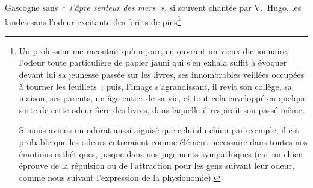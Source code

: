 \documentclass[french,twoside]{book} %
\begin{document}
Gascogne sans \emph{« l’âpre senteur des mers »}, si souvent chantée par V. Hugo, les landes sans l’odeur excitante des forêts de pins\footnote{\noindent Un professeur me racontait qu’un jour, en ouvrant un vieux dictionnaire, l’odeur toute particulière de papier jauni qui s’en exhala suffit à évoquer devant lui sa jeunesse passée sur les livres, ses innombrables veillées occupées à tourner les feuillets ; puis, l’image s’agrandissant, il revit son collège, sa maison, ses parents, un âge entier de sa vie, et tout cela enveloppé en quelque sorte de cette odeur âcre des livres, dans laquelle il respirait son passé même.\par
Si nous avions un odorat aussi aiguisé que celui du chien par exemple, il est probable que les odeurs entreraient comme élément nécessaire dans toutes nos émotions esthétiques, jusque dans nos jugements sympathiques (car un chien éprouve de la répulsion ou de l’attraction pour les gens suivant leur odeur, comme nous suivant l’expression de la physionomie).
}.\par
\end{document}
